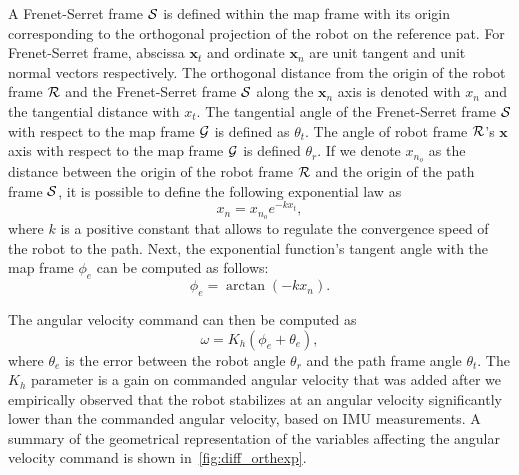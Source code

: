A Frenet-Serret frame $\mathcal{S}$ is defined within the map frame with its origin corresponding to the orthogonal projection of the robot on the reference pat.
For Frenet-Serret frame, abscissa $\bm x_t$ and ordinate $\bm x_n$ are unit tangent and unit normal vectors respectively. 
The orthogonal distance from the origin of the robot frame $\mathcal{R}$ and the Frenet-Serret frame $\mathcal{S}$ along the $\bm x_n$ axis is denoted with $x_n$ and the tangential distance with $x_t$.
The tangential angle of the Frenet-Serret frame $\mathcal{S}$ with respect to the map frame $\mathcal{G}$ is defined as $\theta_t$.
The angle of robot frame $\mathcal{R}$'s $\bm x$ axis with respect to the map frame $\mathcal{G}$ is defined $\theta_r$. %
If we denote $x_{n_o}$ as the distance between the origin of the robot frame $\mathcal{R}$ and the origin of the path frame $\mathcal{S}$, it is possible to define the following exponential law as
\begin{equation}
\label{eq:exp_law}
	x_n = x_{n_o} e^{-k x_t},
\end{equation}
where $k$ is a positive constant that allows to regulate the convergence speed of the robot to the path.
Next, the exponential function's tangent angle with the map frame $\phi_e$ can be computed as follows:
\begin{equation}
\label{eq:exp_angle}
\phi_e = \arctan(-k x_n).
\end{equation}

The angular velocity command can then be computed as %
\begin{equation}
\label{eq:exp_PD}
	\omega = K_h (\phi_e + \theta_e),
\end{equation}
where $\theta_e$ is the error between the robot angle $\theta_r$ and the path frame angle $\theta_t$.
The $K_h$ parameter is a gain on commanded angular velocity that was added after we empirically observed that the robot stabilizes at an angular velocity significantly lower than the commanded angular velocity, based on \ac{IMU} measurements.
A summary of the geometrical representation of the variables affecting the angular velocity command is shown in~\autoref{fig:diff_orthexp}.

